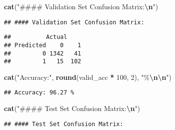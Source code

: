 \documentclass[
]{article}
\newenvironment{Shaded}{\begin{snugshade}}{\end{snugshade}}
\newcommand{\AttributeTok}[1]{\textcolor[rgb]{0.13,0.29,0.53}{#1}}
\newcommand{\DecValTok}[1]{\textcolor[rgb]{0.00,0.00,0.81}{#1}}
\newcommand{\FunctionTok}[1]{\textcolor[rgb]{0.13,0.29,0.53}{\textbf{#1}}}
\newcommand{\NormalTok}[1]{#1}
\newcommand{\OtherTok}[1]{\textcolor[rgb]{0.56,0.35,0.01}{#1}}
\newcommand{\SpecialCharTok}[1]{\textcolor[rgb]{0.81,0.36,0.00}{\textbf{#1}}}
\newcommand{\StringTok}[1]{\textcolor[rgb]{0.31,0.60,0.02}{#1}}
\begin{document}
\begin{Shaded}
\begin{Highlighting}[]
\FunctionTok{cat}\NormalTok{(}\StringTok{"\#\#\#\# Validation Set Confusion Matrix:}\SpecialCharTok{\textbackslash{}n}\StringTok{"}\NormalTok{)}
\end{Highlighting}
\end{Shaded}

\begin{verbatim}
## #### Validation Set Confusion Matrix:
\end{verbatim}

\begin{Shaded}
\end{Shaded}

\begin{verbatim}
##          Actual
## Predicted    0    1
##         0 1342   41
##         1   15  102
\end{verbatim}

\begin{Shaded}
\begin{Highlighting}[]
\FunctionTok{cat}\NormalTok{(}\StringTok{"Accuracy:"}\NormalTok{, }\FunctionTok{round}\NormalTok{(valid\_acc }\SpecialCharTok{*} \DecValTok{100}\NormalTok{, }\DecValTok{2}\NormalTok{), }\StringTok{"\%}\SpecialCharTok{\textbackslash{}n\textbackslash{}n}\StringTok{"}\NormalTok{)}
\end{Highlighting}
\end{Shaded}

\begin{verbatim}
## Accuracy: 96.27 %
\end{verbatim}

\begin{Shaded}
\begin{Highlighting}[]
\FunctionTok{cat}\NormalTok{(}\StringTok{"\#\#\#\# Test Set Confusion Matrix:}\SpecialCharTok{\textbackslash{}n}\StringTok{"}\NormalTok{)}
\end{Highlighting}
\end{Shaded}

\begin{verbatim}
## #### Test Set Confusion Matrix:
\end{verbatim}
\end{document}
